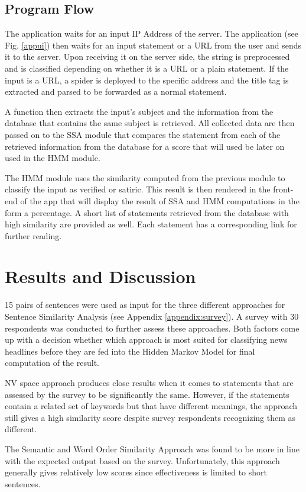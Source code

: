 \documentclass[journal]{./IEEEtran}
\begin{document}
	\subsection{Program Flow}
	The application waits for an input IP Address of the server. The application (see Fig. \ref{appui}) then waits for an input statement or a URL from the user and sends it to the server. Upon receiving it on the server side, the string is preprocessed and is classified depending on whether it is a URL or a plain statement. If the input is a URL, a spider is deployed to the specific address and the title tag is extracted and parsed to be forwarded as a normal statement.
	
	A function then extracts the input's subject and the information from the database that contains the same subject is retrieved. All collected data are then passed on to the SSA module that compares the statement from each of the retrieved information from the database for a score that will used be later on used in the HMM module.
	
	The HMM module uses the similarity computed from the previous module to classify the input as verified or satiric. This result is then rendered in the front-end of the app that will display the result of SSA and HMM computations in the form a percentage. A short list of statements retrieved from the database with high similarity are provided as well. Each statement has a corresponding link for further reading.

	\section{Results and Discussion}
	15 pairs of sentences were used as input for the three different approaches for Sentence Similarity Analysis (see Appendix \ref{appendix:survey}). A survey with 30 respondents was conducted to further assess these approaches. Both factors come up with a decision whether which approach is most suited for classifying news headlines before they are fed into the Hidden Markov Model for final computation of the result.
	
	NV space approach produces close results when it comes to statements that are assessed by the survey to be significantly the same. However, if the statements contain a related set of keywords but that have different meanings, the approach still gives a high similarity score despite survey respondents recognizing them as different.
	
	The Semantic and Word Order Similarity Approach was found to be more in line with the expected output based on the survey. Unfortunately, this approach generally gives relatively low scores since effectiveness is limited to short sentences.
	
\end{document}
